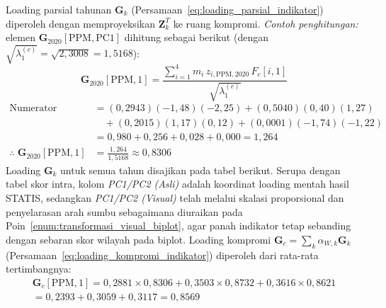 Loading parsial tahunan $\mathbf{G}_k$ (Persamaan~\ref{eq:loading_parsial_indikator}) diperoleh dengan memproyeksikan $\mathbf{Z}_k^T$ ke ruang kompromi. \textit{Contoh penghitungan:} elemen $\mathbf{G}_{2020}[\text{PPM},\text{PC1}]$ dihitung sebagai berikut (dengan $\sqrt{\lambda_1^{(c)}}=\sqrt{2{,}3008}=1{,}5168$):
\[
  \mathbf{G}_{2020}[\text{PPM},1] = \frac{\displaystyle\sum_{i=1}^4 m_i\,z_{i,\text{PPM},2020}\,F_c[i,1]}{\sqrt{\lambda_1^{(c)}}}
\]
\begin{align*}
  \text{Numerator} &= (0{,}2943)(-1{,}48)(-2{,}25)+(0{,}5040)(0{,}40)(1{,}27) \\
  &\quad +(0{,}2015)(1{,}17)(0{,}12)+(0{,}0001)(-1{,}74)(-1{,}22) \\
  &= 0{,}980+0{,}256+0{,}028+0{,}000 = 1{,}264 \\[4pt]
  \therefore\;\mathbf{G}_{2020}[\text{PPM},1] &= \frac{1{,}264}{1{,}5168} \approx 0{,}8306
\end{align*}
Loading $\mathbf{G}_k$ untuk semua tahun disajikan pada tabel berikut. Serupa dengan tabel skor intra, kolom \textit{PC1/PC2 (Asli)} adalah koordinat loading mentah hasil STATIS, sedangkan \textit{PC1/PC2 (Visual)} telah melalui skalasi proporsional dan penyelarasan arah sumbu sebagaimana diuraikan pada Poin~\ref{enum:transformasi_visual_biplot}, agar panah indikator tetap sebanding dengan sebaran skor wilayah pada biplot. Loading kompromi $\mathbf{G}_c = \sum_k \alpha_{W,k}\mathbf{G}_k$ (Persamaan~\ref{eq:loading_kompromi_indikator}) diperoleh dari rata-rata tertimbangnya:
\begin{multline*}
  \mathbf{G}_c[\text{PPM},1] = 0{,}2881\times 0{,}8306 + 0{,}3503\times 0{,}8732 + 0{,}3616\times 0{,}8621 \\
  = 0{,}2393+0{,}3059+0{,}3117 = 0{,}8569
\end{multline*}
{\captionsetup[table]{list=no}}
{\captionsetup[table]{list=no}}
{\captionsetup[table]{list=no}}


